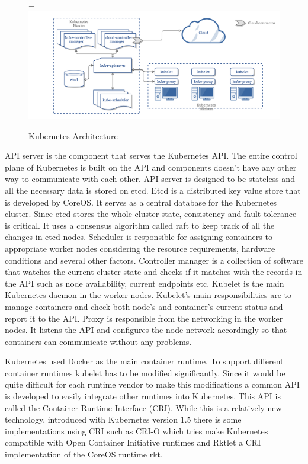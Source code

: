 \documentclass[12pt,oneandhalf,chaparabic,ceng,ms,eng,oneside,pntc]{gsufbe}
\makeatletter
\let\old@includegraphics\includegraphics
\renewcommand{\includegraphics}[2][,]{%
  \setbox9=\hbox{\old@includegraphics[#1]{#2}}%
  \ifdim\wd9>\textwidth
    \old@includegraphics[#1,width=\textwidth]{#2}%
  \else
    \old@includegraphics[#1]{#2}%
  \fi%
}
\makeatother
\begin{document}
\begin{figure}
\centering
\includegraphics[]{k8s-arch.png}
\caption{Kubernetes Architecture}
\label{fig:k8sarch}
\end{figure}

API server is the component that serves the Kubernetes API. The entire control plane of Kubernetes is
built on the API and components doesn't have any other way to communicate with each other. API server
is designed to be stateless and all the necessary data is stored on etcd.
Etcd is a distributed key value store that is developed by CoreOS. It serves as a central database for
the Kubernetes cluster. Since etcd stores the whole cluster state, consistency and fault tolerance is
critical. It uses a consensus algorithm called raft to keep track of all the changes in etcd nodes.
Scheduler is responsible for assigning containers to appropriate worker nodes considering the resource
requirements, hardware conditions and several other factors.
Controller manager is a collection of software that watches the current cluster state and checks if it
matches with the records in the API such as node availability, current endpoints etc.
Kubelet is the main Kubernetes daemon in the worker nodes. Kubelet's main responsibilities are to 
manage containers and check both node's and container's current status and report it to the API.
Proxy is responsible from the networking in the worker nodes. It listens the API and configures the
node network accordingly so that containers can communicate without any problems.

Kubernetes used Docker as the main container runtime. To support different container runtimes kubelet
has to be modified significantly. Since it would be quite difficult for each runtime vendor to make
this modifications a common API is developed to easily integrate other runtimes into Kubernetes. This
API is called the Container Runtime Interface (CRI). While this is a relatively new technology,
introduced with Kubernetes version 1.5 there is some implementations using CRI such as CRI-O which
tries make Kubernetes compatible with Open Container Initiative runtimes and Rktlet a CRI
implementation of the CoreOS runtime rkt.
\end{document}
